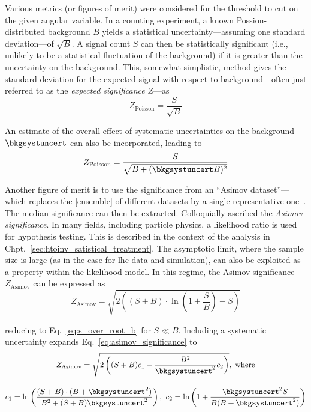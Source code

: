 Various metrics (or figures of merit) were considered for the threshold to cut on the given angular variable. In a counting experiment, a known Possion-distributed background $B$ yields a statistical uncertainty---assuming one standard deviation---of $\sqrt{B}$. A signal count $S$ can then be statistically significant (i.e., unlikely to be a statistical fluctuation of the background) if it is greater than the uncertainty on the background. This, somewhat simplistic, method gives the standard deviation for the expected signal with respect to background---often just referred to as the \emph{expected significance} $Z$---as
\begin{equation}
Z_{\mathrm{Poisson}} = \frac{S}{\sqrt{B}}
\label{eq:s_over_root_b}
\end{equation}

An estimate of the overall effect of systematic uncertainties on the background $\bkgsystuncert$ can also be incorporated, leading to
\begin{equation}
Z_{\mathrm{Poisson}} = \frac{S}{\sqrt{B + (\bkgsystuncert B)^2}}
\label{eq:s_over_root_b_systs}
\end{equation}

Another figure of merit is to use the significance from an ``Asimov dataset''---which replaces the [ensemble] of different datasets by a single representative one~\cite{Cowan:2010js}. The median significance can then be extracted. Colloquially ascribed the \emph{Asimov significance}. In many fields, including particle physics, a likelihood ratio is used for hypothesis testing. This is described in the context of the analysis in Chpt.~\ref{sec:htoinv_satistical_treatment}. The asymptotic limit, where the sample size is large (as in the case for \acrshort{lhc} data and simulation), can also be exploited as a property within the likelihood model. In this regime, the Asimov significance $Z_{\mathrm{Asimov}}$ can be expressed as  %
\begin{equation}
Z_{\mathrm{Asimov}} = \sqrt{2 \left( (S + B) \cdot \ln\left(1 + \frac{S}{B} \right) - S \right)}
\label{eq:asimov_significance}
\end{equation}

reducing to Eq.~\ref{eq:s_over_root_b} for $S \ll B$. Including a systematic uncertainty expands Eq.~\ref{eq:asimov_significance} to
\begin{equation}
    \begin{gathered}  %
Z_{\mathrm{Asimov}} = \sqrt{2 \left( (S + B) c_1 - \frac{B^2}{\bkgsystuncert^2}c_2 \right)}, \ \text{where} \\[1em]
c_1 = \ln\left( \frac{(S + B) \cdot (B + \bkgsystuncert^2)}{B^2 + (S + B)\bkgsystuncert^2} \right), \ c_2 = \ln\left( 1 + \frac{\bkgsystuncert^2 S}{B(B + \bkgsystuncert^2)} \right)
    \end{gathered}
\label{eq:asimov_significance_systs}
\end{equation}

